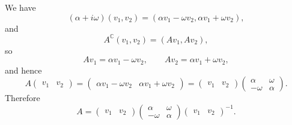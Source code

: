 \documentclass{article}
\begin{document}
We have
\[
(\alpha+i\omega)(v_1,v_2)=(\alpha v_1-\omega v_2,\alpha v_1+\omega v_2),
\]
and
\[
A^\mathbb{C}(v_1,v_2)=(Av_1,Av_2),
\]
so
\[
Av_1=\alpha v_1-\omega v_2, \qquad Av_2=\alpha v_1+\omega v_2,
\]
and
hence
\[
A\begin{pmatrix}v_1&v_2\end{pmatrix}=\begin{pmatrix}\alpha v_1-\omega v_2&\alpha v_1+\omega v_2\end{pmatrix}
=\begin{pmatrix}v_1&v_2\end{pmatrix}
\begin{pmatrix}\alpha&\omega \\ -\omega&\alpha\end{pmatrix}.
\]
Therefore
\[
A=\begin{pmatrix}v_1&v_2\end{pmatrix}
\begin{pmatrix}\alpha&\omega \\ -\omega&\alpha\end{pmatrix}\begin{pmatrix}v_1&v_2\end{pmatrix}^{-1}.
\]
\end{document}

